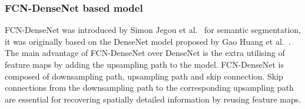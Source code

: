 	\subsubsection{FCN-DenseNet based model}
	FCN-DenseNet was introduced by Simon Jegou et al.~\cite{Jegou} for semantic segmentation, it was originally based on the DenseNet model proposed by Gao Huang et al.~\cite{Huang}. 
	The main advantage of FCN-DenseNet over DenseNet is the extra utilising of feature maps by adding the upsampling path to the model.
	FCN-DenseNet is composed of downsampling path, upsampling path and skip connection.
	Skip connections from the downsampling path to the corresponding upsampling path are essential for recovering spatially detailed information by reusing feature maps.
 

